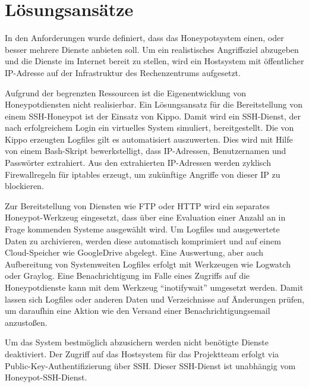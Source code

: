 \chapter{Lösungsansätze}
\label{ch:Lösungsansätze}

In den Anforderungen wurde definiert, dass das Honeypotsystem einen, oder besser mehrere Dienste anbieten soll. Um ein realistisches Angriffsziel abzugeben und die Dienste im Internet bereit zu stellen, wird ein Hostsystem mit öffentlicher IP-Adresse auf der Infrastruktur des Rechenzentrums aufgesetzt.

Aufgrund der begrenzten Ressourcen ist die Eigenentwicklung von Honeypotdiensten  nicht realisierbar. Ein Lösungsansatz für die Bereitstellung von einem SSH-Honeypot ist der Einsatz von Kippo. Damit wird ein SSH-Dienst, der nach erfolgreichem Login ein virtuelles System simuliert, bereitgestellt. Die von Kippo erzeugten Logfiles gilt es automatisiert auszuwerten. Dies wird mit Hilfe von einem Bash-Skript bewerkstelligt, dass IP-Adressen, Benutzernamen und Passwörter extrahiert. Aus den extrahierten IP-Adressen werden zyklisch Firewallregeln für iptables erzeugt, um zukünftige Angriffe von dieser IP zu blockieren.

Zur Bereitstellung von Diensten wie FTP oder HTTP wird ein separates Honeypot-Werkzeug eingesetzt, dass über eine Evaluation einer Anzahl an in Frage kommenden Systeme ausgewählt wird.
Um Logfiles und ausgewertete Daten zu archivieren, werden diese automatisch komprimiert und auf einem Cloud-Speicher wie GoogleDrive abgelegt. Eine Auswertung, aber auch Aufbereitung von Systemweiten Logfiles erfolgt mit Werkzeugen wie Logwatch oder Graylog.
Eine Benachrichtigung im Falle eines Zugriffs auf die Honeypotdienste kann mit dem Werkzeug “inotifywait” umgesetzt werden. Damit lassen sich Logfiles oder anderen Daten und Verzeichnisse auf Änderungen prüfen, um daraufhin eine Aktion wie den Versand einer Benachrichtigungsemail anzustoßen.

Um das System bestmöglich abzusichern werden nicht benötigte Dienste deaktiviert. Der Zugriff auf das Hostsystem für das Projektteam erfolgt via Public-Key-Authentifizierung über SSH. Dieser SSH-Dienst ist unabhängig vom Honeypot-SSH-Dienst.
